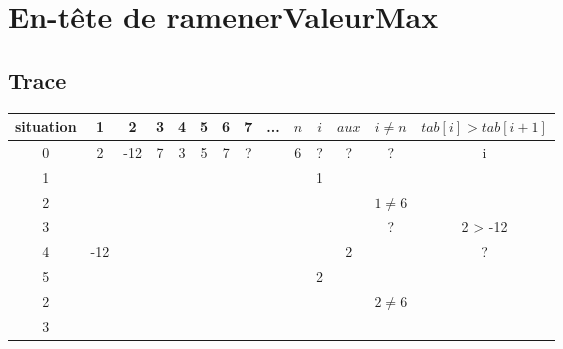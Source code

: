 \documentclass{article}
\begin{document}
		\section{En-tête de ramenerValeurMax}	
			
		\subsection{Trace}		
			\begin{tabular}{|c|c|c|c|c|c|c|c|c|c|c|c|c|c|}
				\hline
					\textbf{situation} & 
					\textbf{1} &
					\textbf{2} &
					\textbf{3} &
					\textbf{4} &
					\textbf{5} &
					\textbf{6} &
					\textbf{7} &
					\textbf{...} &
					\textbf{$n$} &
					\textbf{$i$} &
					\textbf{$aux$} &
					\textbf{$i \ne n$} &
					\textbf{$tab[i] > tab[i+1]$} \\
				\hline
					0 & %
					2 & %
					-12 &%
					7 &%
					3 &%
					5 &%
					7 &%
					? &%
					&%
					6 &%
					?& %
					? &%
					?& %
					i\\%
				\hline
					1 & %
					 & %
					 &%
					 &%
					 &%
					 &%
					 &%
					 &%
					 &%
					 &%
					1& %
					 &%
					& %
					\\%
				\hline
					2 & %
					 & %
					 &%
					 &%
					 &%
					 &%
					 &%
					 &%
					 &%
					 &%
					& %
					 &%
					$1\ne 6$ %
					\\%
				\hline
					 3& %
					 & %
					 &%
					 &%
					 &%
					 &%
					 &%
					 &%
					 &%
					 &%
					& %
					 &%
					?& %
					2 > -12 \\%
				\hline
					 4& %
					 -12& %
					 &%
					 &%
					 &%
					 &%
					 &%
					 &%
					 &%
					 &%
					& %
					2 &%
					& %
					? \\%
				\hline
					 5& %
					 & %
					 &%
					 &%
					 &%
					 &%
					 &%
					 &%
					 &%
					 &%
					2& %
					 &%
					& %
					\\
				\hline
					 2& %
					 & %
					 &%
					 &%
					 &%
					 &%
					 &%
					 &%
					 &%
					 &%
					& %
					 &%
					$2 \ne 6$& %
					 \\%
				\hline
					 3& %
					 & %
					 &%
					 &%

\end{tabular}
\end{document}
